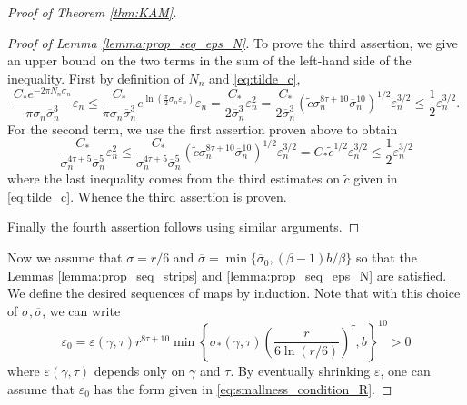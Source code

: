 \documentclass[10pt,a4paper]{amsart}
\begin{document}
\begin{proof}[Proof of Theorem \ref{thm:KAM}]
\begin{proof}[Proof of Lemma \ref{lemma:prop_seq_eps_N}]
To prove the third assertion, we give an upper bound on the two terms in the sum of the left-hand side of the inequality. First by definition of $N_n$ and \eqref{eq:tilde_c},
\[
    \frac{C_\ast e^{-2\pi N_n\sigma_n}}{\pi\sigma_n \overline \sigma_n^3}\varepsilon_n
    \leq 
    \frac{C_\ast}{\pi\sigma_n\overline \sigma_n^3}
    e^{
    \ln\left(
    \frac{\pi}{2}\sigma_n\varepsilon_n
    \right)
    }
    \varepsilon_n
    =
        \frac{C_\ast}{2 \overline \sigma_n^3}  \varepsilon^{2}_n
        =
    \frac{C_\ast}{2 \overline \sigma_n^3}  \left(\tilde c\sigma_n^{8\tau+10}\overline\sigma_n^{10}\right)^{1/2}\varepsilon^{3/2}_n
    \leq
    \frac{1}{2}\varepsilon_n^{3/2}.
\]
For the second term, we use the first assertion proven above to obtain
\[
    \frac{C_\ast}{\sigma_n^{4\tau+5}\overline\sigma_n^5}\varepsilon_n^2
    \leq
    \frac{C_\ast}{\sigma_n^{4\tau+5}\overline\sigma_n^5}
    \left(\tilde c\sigma_n^{8\tau+10}\overline\sigma_n^{10}\right)^{1/2}
    \varepsilon_n^{3/2}
    = 
    C_\ast\tilde c^{1/2}\varepsilon_n^{3/2}
    \leq 
    \frac{1}{2}\varepsilon_n^{3/2}
\]
where the last inequality comes from the third estimates on $\tilde c$ given in \eqref{eq:tilde_c}. Whence the third assertion is proven. 

Finally the fourth assertion follows using similar arguments.
\end{proof}

\vspace{0.2cm}
Now we assume that $\sigma =  r/6$ and $\overline\sigma= \min\{\overline\sigma_0,(\beta-1)b/\beta\}
$ so that the Lemmas \ref{lemma:prop_seq_strips} and \ref{lemma:prop_seq_eps_N} are satisfied. We define the desired sequences of maps by induction. Note that with this choice of $\sigma, \overline\sigma$, we can write 
\[
\varepsilon_0 = \varepsilon(\gamma,\tau)r^{8\tau + 10}
\min\left\{\sigma_\ast(\gamma,\tau)\left(\frac{r}{6\ln (r/6)}\right)^{\tau},b\right\}^{10}>0
\]
where $\varepsilon(\gamma,\tau)$ depends only on $\gamma$ and $\tau$. By eventually shrinking $\varepsilon$, one can assume that $\varepsilon_0$ has the form given in \eqref{eq:smallness_condition_R}.


\end{proof}
\end{document}
